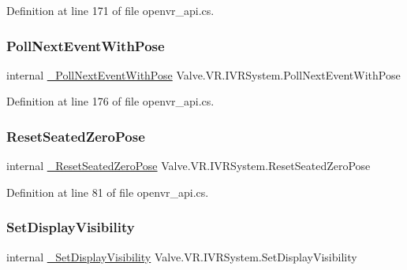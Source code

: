 Definition at line 171 of file openvr\+\_\+api.\+cs.

\mbox{\label{struct_valve_1_1_v_r_1_1_i_v_r_system_a1d29adecbeff4cc37b4e30f83d74efa2}} 
\subsubsection{\texorpdfstring{PollNextEventWithPose}{PollNextEventWithPose}}
{\footnotesize\ttfamily internal \mbox{\hyperlink{struct_valve_1_1_v_r_1_1_i_v_r_system_a651836066c8780d5e5aadab482bd22d3}{\+\_\+\+Poll\+Next\+Event\+With\+Pose}} Valve.\+V\+R.\+I\+V\+R\+System.\+Poll\+Next\+Event\+With\+Pose}



Definition at line 176 of file openvr\+\_\+api.\+cs.

\mbox{\label{struct_valve_1_1_v_r_1_1_i_v_r_system_a6bc413a891810fc8e6d122f89ff3e4d2}} 
\subsubsection{\texorpdfstring{ResetSeatedZeroPose}{ResetSeatedZeroPose}}
{\footnotesize\ttfamily internal \mbox{\hyperlink{struct_valve_1_1_v_r_1_1_i_v_r_system_ae73e4e8327964bc0c9947bebed6f41fd}{\+\_\+\+Reset\+Seated\+Zero\+Pose}} Valve.\+V\+R.\+I\+V\+R\+System.\+Reset\+Seated\+Zero\+Pose}



Definition at line 81 of file openvr\+\_\+api.\+cs.

\mbox{\label{struct_valve_1_1_v_r_1_1_i_v_r_system_a7f7b4443ca65064f398c08d07ac068ca}} 
\subsubsection{\texorpdfstring{SetDisplayVisibility}{SetDisplayVisibility}}
{\footnotesize\ttfamily internal \mbox{\hyperlink{struct_valve_1_1_v_r_1_1_i_v_r_system_a97b502df669ebd8f271bea132cd15eed}{\+\_\+\+Set\+Display\+Visibility}} Valve.\+V\+R.\+I\+V\+R\+System.\+Set\+Display\+Visibility}



